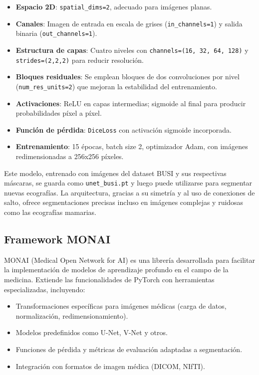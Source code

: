 \documentclass[12pt]{article}
\begin{document}
\begin{itemize}
  \item \textbf{Espacio 2D}: \texttt{spatial\_dims=2}, adecuado para imágenes planas.
  \item \textbf{Canales}: Imagen de entrada en escala de grises (\texttt{in\_channels=1}) y salida binaria (\texttt{out\_channels=1}).
  \item \textbf{Estructura de capas}: Cuatro niveles con \texttt{channels=(16, 32, 64, 128)} y \texttt{strides=(2,2,2)} para reducir resolución.
  \item \textbf{Bloques residuales}: Se emplean bloques de dos convoluciones por nivel (\texttt{num\_res\_units=2}) que mejoran la estabilidad del entrenamiento.
  \item \textbf{Activaciones}: ReLU en capas intermedias; sigmoide al final para producir probabilidades píxel a píxel.
  \item \textbf{Función de pérdida}: \texttt{DiceLoss} con activación sigmoide incorporada.
  \item \textbf{Entrenamiento}: 15 épocas, batch size 2, optimizador Adam, con imágenes redimensionadas a 256x256 píxeles.
\end{itemize}

Este modelo, entrenado con imágenes del dataset BUSI y sus respectivas máscaras, se guarda como \texttt{unet\_busi.pt} y luego puede utilizarse para segmentar nuevas ecografías. La arquitectura, gracias a su simetría y al uso de conexiones de salto, ofrece segmentaciones precisas incluso en imágenes complejas y ruidosas como las ecografías mamarias.

\subsection*{Framework MONAI}
MONAI (Medical Open Network for AI) es una librería desarrollada para facilitar la implementación de modelos de aprendizaje profundo en el campo de la medicina. Extiende las funcionalidades de PyTorch con herramientas especializadas, incluyendo:

\begin{itemize}
    \item Transformaciones específicas para imágenes médicas (carga de datos, normalización, redimensionamiento).
    \item Modelos predefinidos como U-Net, V-Net y otros.
    \item Funciones de pérdida y métricas de evaluación adaptadas a segmentación.
    \item Integración con formatos de imagen médica (DICOM, NIfTI).
\end{itemize}
\end{document}
